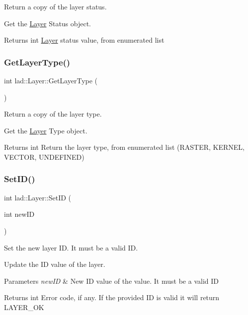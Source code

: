 Return a copy of the layer status. 

Get the \hyperlink{classlad_1_1_layer}{Layer} Status object.

\begin{DoxyReturn}{Returns}
int \hyperlink{classlad_1_1_layer}{Layer} status value, from enumerated list 
\end{DoxyReturn}
\mbox{\label{classlad_1_1_layer_aedd28090728135c4ae8a445f0d016b2c}} 
\subsubsection{\texorpdfstring{Get\+Layer\+Type()}{GetLayerType()}}
{\footnotesize\ttfamily int lad\+::\+Layer\+::\+Get\+Layer\+Type (\begin{DoxyParamCaption}{ }\end{DoxyParamCaption})}



Return a copy of the layer type. 

Get the \hyperlink{classlad_1_1_layer}{Layer} Type object.

\begin{DoxyReturn}{Returns}
int Return the layer type, from enumerated list (R\+A\+S\+T\+ER, K\+E\+R\+N\+EL, V\+E\+C\+T\+OR, U\+N\+D\+E\+F\+I\+N\+ED) 
\end{DoxyReturn}
\mbox{\label{classlad_1_1_layer_ae2d1e4d8d656967f9367555f6d960b7d}} 
\subsubsection{\texorpdfstring{Set\+I\+D()}{SetID()}}
{\footnotesize\ttfamily int lad\+::\+Layer\+::\+Set\+ID (\begin{DoxyParamCaption}\item[{int}]{new\+ID }\end{DoxyParamCaption})}



Set the new layer ID. It must be a valid ID. 

Update the ID value of the layer.


\begin{DoxyParams}{Parameters}
{\em new\+ID} & New ID value of the value. It must be a valid ID \\
\hline
\end{DoxyParams}
\begin{DoxyReturn}{Returns}
int Error code, if any. If the provided ID is valid it will return L\+A\+Y\+E\+R\+\_\+\+OK 
\end{DoxyReturn}
\mbox{\label{classlad_1_1_layer_a7572fd2665a35c074b2f341ce8f73030}} 
